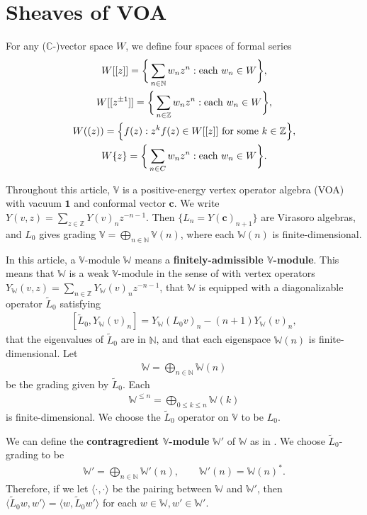 \documentclass[12pt,a4paper,notitlepage]{article}
\theoremstyle{definition}
\theoremstyle{plain}
\newcommand{\wtd}{\widetilde}
\newcommand{\id}{\mathbf{1}}
\newcommand{\bk}[1]{\langle {#1}\rangle}
\newcommand{\mbb}{\mathbb}
\newcommand{\Vbb}{\mathbb V}
\newcommand{\Wbb}{\mathbb W}
\newcommand{\Cbb}{\mathbb C}
\newcommand{\Nbb}{\mathbb N}
\newcommand{\Zbb}{\mathbb Z}
\newcommand{\cbf}{\mathbf c}
\numberwithin{equation}{section}
\begin{document}
\section{Sheaves of VOA}\label{lb1}


For any ($\Cbb$-)vector space $W$, we define four spaces of formal series 
\begin{gather*}
W[[z]]=\bigg\{\sum_{n\in\mathbb N}w_nz^n:\text{each }w_n\in W\bigg\},\\
W[[z^{\pm 1}]]=\bigg\{\sum_{n\in\mathbb Z}w_nz^n:\text{each }w_n\in W\bigg\},\\
W((z))=\Big\{f(z):z^kf(z)\in W[[z]]\text{ for some }k\in\mbb Z \Big\},\\
W\{z\}=\bigg\{\sum_{n\in\mathbb \Cbb}w_nz^n:\text{each }w_n\in W\bigg\}.
\end{gather*}


Throughout this article, $\Vbb$ is a positive-energy vertex operator algebra (VOA) with vacuum $\id$ and conformal vector $\cbf$. We write $Y(v,z)=\sum_{z\in\Zbb}Y(v)_nz^{-n-1}$. Then $\{L_n=Y(\cbf)_{n+1}\}$ are Virasoro algebras, and $L_0$ gives grading $\Vbb=\bigoplus_{n\in\Nbb}\Vbb(n)$, where each $\Wbb(n)$ is finite-dimensional. 

In this article,  a $\Vbb$-module $\Wbb$ means a \textbf{finitely-admissible $\Vbb$-module}. This means that $\Wbb$ is a weak $\Vbb$-module in the sense of \cite{DLM97} with vertex operators $Y_\Wbb(v,z)=\sum_{n\in\Zbb}Y_\Wbb(v)_nz^{-n-1}$, that $\Wbb$ is equipped with a diagonalizable operator $\wtd L_0$ satisfying \index{L0@$\wtd L_0$}  
\begin{align}\label{eq34}
[\wtd L_0,Y_\Wbb(v)_n]=Y_\Wbb(L_0 v)_n-(n+1)Y_\Wbb(v)_n,	
\end{align}
that the eigenvalues of $\wtd L_0$ are in $\Nbb$, and that each eigenspace $\Wbb(n)$ is finite-dimensional. Let \index{W@$\Wbb(n),\Wbb_{(n)}$}
\begin{align*}
	\Wbb=\bigoplus_{n\in\Nbb}\Wbb(n)	
\end{align*}
be the grading given by $\wtd L_0$. Each
\begin{align*}
	\Wbb^{\leq n}=\bigoplus_{0\leq k\leq n}	\Wbb{(k)}
\end{align*}
is finite-dimensional. We choose  the $\wtd L_0$ operator on $\Vbb$ to be $L_0$.

We can define the \textbf{contragredient $\Vbb$-module} $\Wbb'$ of $\Wbb$ as in \cite{FHL93}. We choose $\wtd L_0$-grading to be
\begin{align*}
\Wbb'=	\bigoplus_{n\in\Nbb}\Wbb'{(n)},\qquad \Wbb'{(n)}=\Wbb{(n)}^*.
\end{align*}
Therefore, if we let $\bk{\cdot,\cdot}$ be the pairing between $\Wbb$ and $\Wbb'$, then $\bk{\wtd L_0 w,w'}=\bk{w,\wtd L_0 w'}$ for each $w\in\Wbb,w'\in\Wbb'$.
\end{document}
